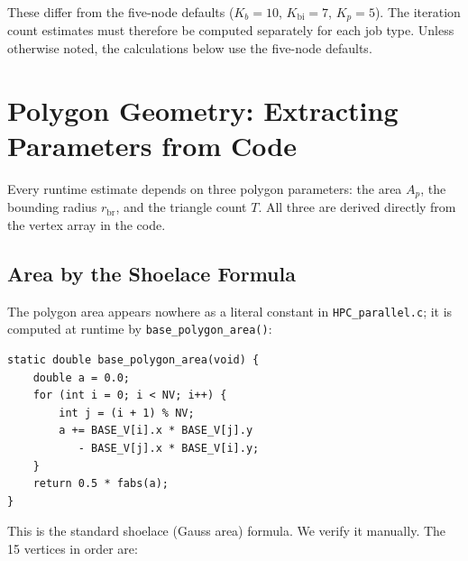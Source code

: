 \documentclass[11pt,oneside]{article}
\begin{document}
These differ from the five-node defaults ($K_b = 10$, $K_{\mathrm{bi}}
= 7$, $K_p = 5$). The iteration count estimates must therefore be
computed separately for each job type. Unless otherwise noted, the
calculations below use the five-node defaults.

\section{Polygon Geometry: Extracting Parameters from Code}
\label{sec:geometry}

Every runtime estimate depends on three polygon parameters: the area
$A_p$, the bounding radius $r_{\mathrm{br}}$, and the triangle count
$T$. All three are derived directly from the vertex array in the code.

\subsection{Area by the Shoelace Formula}

The polygon area appears nowhere as a literal constant in
\texttt{HPC\_parallel.c}; it is computed at runtime by
\texttt{base\_polygon\_area()}:

\begin{lstlisting}[style=cstyle,caption={\texttt{base\_polygon\_area()} in \texttt{HPC\_parallel.c}.}]
static double base_polygon_area(void) {
    double a = 0.0;
    for (int i = 0; i < NV; i++) {
        int j = (i + 1) % NV;
        a += BASE_V[i].x * BASE_V[j].y
           - BASE_V[j].x * BASE_V[i].y;
    }
    return 0.5 * fabs(a);
}
\end{lstlisting}

This is the standard shoelace (Gauss area) formula. We verify it
manually. The 15 vertices in order are:
\end{document}

